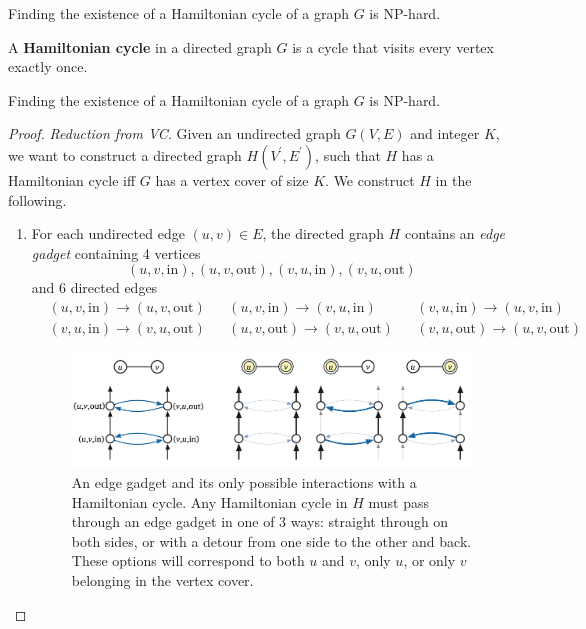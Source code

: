     \begin{theorem}
      Finding the existence of a Hamiltonian cycle of a graph $G$ is NP-hard. 
    \end{theorem}

    \begin{definition}
      A \textbf{Hamiltonian cycle} in a directed graph $G$ is a cycle that visits every vertex exactly once. 
    \end{definition}

    \begin{theorem}
      Finding the existence of a Hamiltonian cycle of a graph $G$ is NP-hard. 
    \end{theorem}
    \begin{proof}
      \textit{Reduction from VC}. Given an undirected graph $G(V, E)$ and integer $K$, we want to construct a directed graph $H(V^\prime, E^\prime)$, such that $H$ has a Hamiltonian cycle iff $G$ has a vertex cover of size $K$. We construct $H$ in the following. 
      \begin{enumerate}
        \item For each undirected edge $(u, v) \in E$, the directed graph $H$ contains an \textit{edge gadget} containing 4 vertices 
          \begin{equation}
            (u, v, \mathrm{in}), (u, v, \mathrm{out}), (v, u, \mathrm{in}), (v, u, \mathrm{out})
          \end{equation}
          and 6 directed edges 
          \begin{align*}
            & (u, v, \mathrm{in}) \rightarrow (u, v, \mathrm{out}) & 
            & (u, v, \mathrm{in}) \rightarrow (v, u, \mathrm{in}) & 
            & (v, u, \mathrm{in}) \rightarrow (u, v, \mathrm{in}) \\
            & (v, u, \mathrm{in}) \rightarrow (v, u, \mathrm{out}) & 
            & (u, v, \mathrm{out}) \rightarrow (v, u, \mathrm{out}) & 
            & (v, u, \mathrm{out}) \rightarrow (u, v, \mathrm{out})
          \end{align*}

          \begin{figure}[H]
            \centering 
            \includegraphics[scale=0.4]{img/edge_gadget.png}
            \caption{An edge gadget and its only possible interactions with a Hamiltonian cycle. Any Hamiltonian cycle in $H$ must pass through an edge gadget in one of 3 ways: straight through on both sides, or with a detour from one side to the other and back. These options will correspond to both $u$ and $v$, only $u$, or only $v$ belonging in the vertex cover.} 
            \label{fig:edge_gadget}
          \end{figure}


\end{enumerate}
\end{proof}
